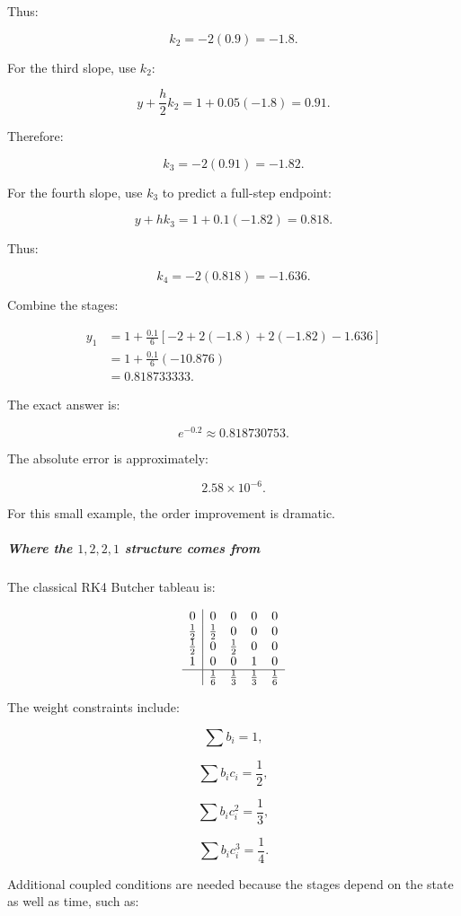 Thus:

\[
k_2=-2(0.9)=-1.8.
\]

For the third slope, use \(k_2\):

\[
y+\frac h2k_2 = 1+0.05(-1.8)=0.91.
\]

Therefore:

\[
k_3=-2(0.91)=-1.82.
\]

For the fourth slope, use \(k_3\) to predict a full-step endpoint:

\[
y+hk_3=1+0.1(-1.82)=0.818.
\]

Thus:

\[
k_4=-2(0.818)=-1.636.
\]

Combine the stages:

\[
\begin{aligned} y_1 &=1+\frac{0.1}{6} [-2+2(-1.8)+2(-1.82)-1.636]\\ &=1+\frac{0.1}{6}(-10.876)\\ &=\boxed{0.818733333}. \end{aligned}
\]

The exact answer is:

\[
e^{-0.2}\approx0.818730753.
\]

The absolute error is approximately:

\[
2.58\times10^{-6}.
\]

For this small example, the order improvement is dramatic.

\subparagraph{\texorpdfstring{Where the \(1,2,2,1\) structure comes from}{Where the 1,2,2,1 structure comes from}}\label{02-foundations-ii-ch025-where-the-1221-structure-comes-from}

The classical RK4 Butcher tableau is:

\[
\begin{array}{c|cccc} 0&0&0&0&0\\ \frac12&\frac12&0&0&0\\ \frac12&0&\frac12&0&0\\ 1&0&0&1&0\\ \hline &\frac16&\frac13&\frac13&\frac16 \end{array}
\]

The weight constraints include:

\[
\sum b_i=1,
\]

\[
\sum b_ic_i=\frac12,
\]

\[
\sum b_ic_i^2=\frac13,
\]

\[
\sum b_ic_i^3=\frac14.
\]

Additional coupled conditions are needed because the stages depend on the state as well as time, such as:

